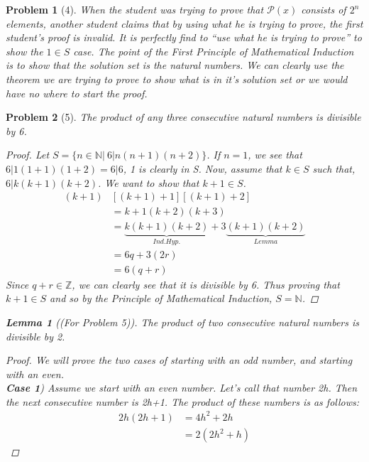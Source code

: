 \documentclass{article}
\theoremstyle{problem}
\newtheorem{prob}{Problem}
\theoremstyle{plain}
\newtheorem{lem}{Lemma}
\begin{document}
  \begin{prob}[4]
    When the student was trying to prove that $\mathscr{P}(x)$ consists of $2^n$ elements, another student claims that by using what he is trying to prove, the first student's proof is invalid. It is perfectly find to ``use what he is trying to prove'' to show the $1 \in S$ case. The point of the First Principle of Mathematical Induction is to show that the solution set is the natural numbers. We can clearly use the theorem we are trying to prove to show what is in it's solution set or we would have no where to start the proof.
  \end{prob}

  \begin{prob}[5]
    The product of any three consecutive natural numbers is divisible by 6.
    \begin{multicols}{2}
    \begin{proof}
      Let $S = \{n \in \mathbb{N} |\ 6 | n(n+1)(n+2)\}$. If $n = 1$, we see that $6|1(1+1)(1+2) = 6|6$, 1 is clearly in S. Now, assume that $k \in S$ such that, $6|k(k+1)(k+2)$. We want to show that $k+1 \in S$.
      \begin{align*}
        (k+1)&[(k+1)+1][(k+1)+2] \\
        &= k+1(k+2)(k+3)\\
        &= \underbrace{k(k+1)(k+2)}_{Ind. Hyp.} + 3\underbrace{(k+1)(k+2)}_{Lemma}\\
        &= 6q + 3(2r)\\
        &= 6(q + r)        
      \end{align*}
      Since $q + r \in \mathbb{Z}$, we can clearly see that it is divisible by 6. Thus proving that $k + 1 \in S$ and so by the Principle of Mathematical Induction, $S=\mathbb{N}$.
    \end{proof}
    \vfill
    \columnbreak
    \begin{lem}[(For Problem 5)]
      The product of two consecutive natural numbers is divisible by 2.
      \begin{proof}
        We will prove the two cases of starting with an odd number, and starting with an even.\\        
        \textbf{Case 1}) Assume we start with an even number. Let's call that number 2h. Then the next consecutive number is 2h+1. The product of these numbers is as follows:
          \begin{align*}
            2h(2h+1) &= 4h^2 + 2h\\
            &= 2(2h^2 + h)
          \end{align*}

\end{proof}
\end{lem}
\end{multicols}
\end{prob}
\end{document}
